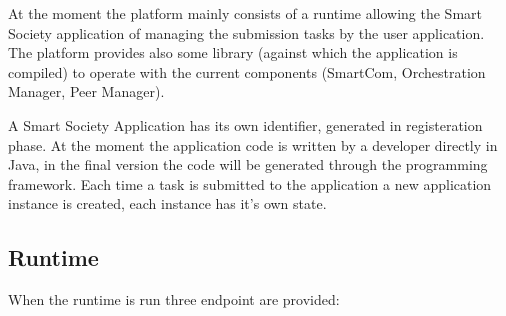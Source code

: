 At the moment the platform mainly consists of a runtime allowing the Smart Society application of managing the submission tasks by the user application. The platform provides also some library (against which the application is compiled) to operate with the current components (SmartCom, Orchestration Manager, Peer Manager).

A Smart Society Application has its own identifier, generated in registeration phase. At the moment the application code is written by a developer directly in Java, in the final version the code will be generated through the programming framework. Each time a task is submitted to the application
a new application instance is created, each instance has it's own state.

\subsection{Runtime}

When the runtime is run three endpoint are provided: 

